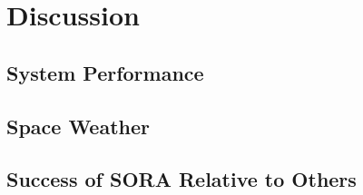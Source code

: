 \section{Discussion}
\label{Discussion}
\subsection{System Performance}
\subsection{Space Weather}
\subsection{Success of SORA Relative to Others}

